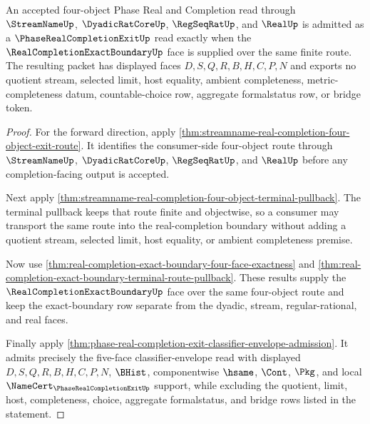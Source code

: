 \begin{theorem}
\label{thm:phase-real-completion-exit-four-object-boundary-lift}
An accepted four-object Phase Real and Completion read through $\StreamNameUp$, $\DyadicRatCoreUp$, $\RegSeqRatUp$, and $\RealUp$ is admitted as a $\PhaseRealCompletionExitUp$ read exactly when the $\RealCompletionExactBoundaryUp$ face is supplied over the same finite route. The resulting packet has displayed faces $D,S,Q,R,B,H,C,P,N$ and exports no quotient stream, selected limit, host equality, ambient completeness, metric-completeness datum, countable-choice row, aggregate formalstatus row, or bridge token.
\end{theorem}
\begin{proof}
For the forward direction, apply \autoref{thm:streamname-real-completion-four-object-exit-route}. It identifies the consumer-side four-object route through $\StreamNameUp$, $\DyadicRatCoreUp$, $\RegSeqRatUp$, and $\RealUp$ before any completion-facing output is accepted.

Next apply \autoref{thm:streamname-real-completion-four-object-terminal-pullback}. The terminal pullback keeps that route finite and objectwise, so a consumer may transport the same route into the real-completion boundary without adding a quotient stream, selected limit, host equality, or ambient completeness premise.

Now use \autoref{thm:real-completion-exact-boundary-four-face-exactness} and \autoref{thm:real-completion-exact-boundary-terminal-route-pullback}. These results supply the $\RealCompletionExactBoundaryUp$ face over the same four-object route and keep the exact-boundary row separate from the dyadic, stream, regular-rational, and real faces.

Finally apply \autoref{thm:phase-real-completion-exit-classifier-envelope-admission}. It admits precisely the five-face classifier-envelope read with displayed $D,S,Q,R,B,H,C,P,N$, $\BHist$, componentwise $\hsame$, $\Cont$, $\Pkg$, and local $\NameCert_{\PhaseRealCompletionExitUp}$ support, while excluding the quotient, limit, host, completeness, choice, aggregate formalstatus, and bridge rows listed in the statement.
\end{proof}

